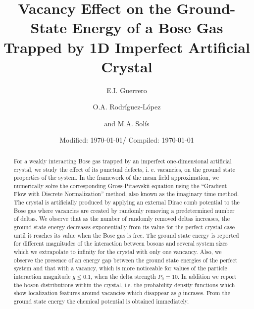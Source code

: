 \documentclass[twocolumn,showpacs,showkeys,preprintnumbers,superscriptaddress, pra, 10pt, aps]{revtex4-2}
\begin{document}
\renewcommand{\lstlistingname}{Código}
\renewcommand{\lstlistlistingname}{Índice de fragmentos de código fuente}
\newcommand{\reflabel}{\mathrm{c}}
\newcommand{\omegac}{\omega_\reflabel}
\newcommand{\charlen}{a_\reflabel}
\newcommand{\gpeham}{\hat{H}_\mathrm{GP}}
\newcommand{\extpotential}{V_\mathrm{ext}}
\newcommand{\chardensity}{n_\reflabel}

\newcommand{\NormPsi}{\Psi'}
\newcommand{\ImagTimePsi}{\tilde{\Psi}}
\newcommand{\planeWaveAmplitude}{\tilde{\psi}_k}

\title{%
  Vacancy Effect on the Ground-State Energy of a Bose Gas
  \\Trapped by 1D Imperfect Artificial Crystal}
\author{E.I. Guerrero}
\author{O.A. Rodríguez-López}
\author{and M.A. Sol\'is }

\date{Modified: \today / Compiled: \today}

\begin{abstract}
  For a weakly interacting Bose gas trapped by an imperfect one-dimensional artificial crystal, we study the effect of its punctual defects, i. e. vacancies, on the ground state properties of the system. In the framework of the mean field approximation, we numerically solve the corresponding Gross-Pitaevskii equation using the ``Gradient Flow with Discrete Normalization'' method, also known as the imaginary time method. The crystal is artificially produced by applying an external Dirac comb potential to the Bose gas
  where vacancies are created by randomly removing a predetermined number of deltas. We observe that as the number of randomly removed deltas increases, the ground state energy decreases exponentially from its value for the perfect crystal case until it reaches its value when the Bose gas is free.
  The ground state energy is reported for different magnitudes of the interaction between bosons and several system sizes which we extrapolate to infinity for the crystal with only one vancancy. Also, we observe the presence of an energy gap between the ground state energies of the perfect system and that with a vacancy, which is more noticeable for values of the particle interaction magnitude $ g \leq 0.1$, when the delta strength $P_0 = 10$. In addition we report the boson distributions within the crystal,
  i.e. the probability density functions which show
  localization features around vacancies which disappear as $g$  incrases. From the ground state energy the chemical potential is obtained immediately.

\end{abstract}
\end{document}
